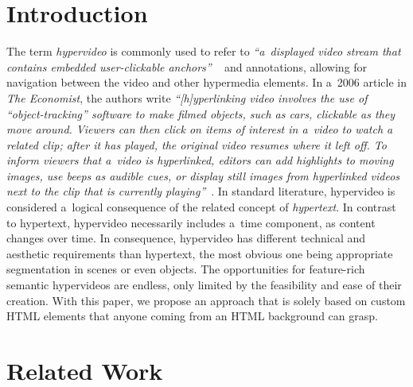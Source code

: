 \documentclass[runningheads,a4paper]{llncs}
\begin{document}
\section{Introduction}

The term \emph{hypervideo} is commonly used to refer to
\textit{``a~displayed video stream that contains embedded user-clickable anchors''}%
~\cite{sawhney1996hypercafe,smith2002extensible}
and annotations, allowing for navigation between the video and other hypermedia elements.
In a~2006 article in \emph{The Economist}, the authors write 
\textit{``[h]yperlinking video involves the use of ``object-tracking'' software
to make filmed objects, such as cars, clickable as they move around.
Viewers can then click on items of interest in a~video
to watch a related clip; after it has played,
the original video resumes where it left off.
To inform viewers that a~video is hyperlinked,
editors can add highlights to moving images, use beeps as audible cues,
or display still images from hyperlinked videos
next to the clip that is currently playing''}~\cite{economist2006hypervideo}.
In standard literature, hypervideo is considered a~logical consequence
of the related concept of \emph{hypertext}.
In contrast to hypertext, hypervideo necessarily includes a~time component,
as content changes over time.
In consequence, hypervideo has different technical and aesthetic requirements
than hypertext, the most obvious one being appropriate segmentation in scenes
or even objects.
The opportunities for feature-rich semantic hypervideos are endless,
only limited by the feasibility and ease of their creation.
With this paper, we propose an approach that is solely based on 
custom HTML elements that anyone coming from an HTML background can grasp.

\section{Related Work}
\end{document}
